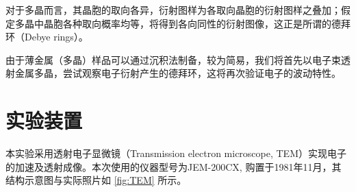 \documentclass[aps,pre,12pt,preprint,%
	onecolumn,showpacs,showkeys,nofootinbib]{revtex4-2}
\begin{document}
	对于多晶而言，其晶胞的取向各异，衍射图样为各取向晶胞的衍射图样之叠加；假定多晶中晶胞各种取向概率均等，将得到各向同性的衍射图像，这正是所谓的德拜环（Debye rings）。
	
	由于薄金属（多晶）样品可以通过沉积法制备，较为简易，我们将首先以电子束透射金属多晶，尝试观察电子衍射产生的德拜环，这将再次验证电子的波动特性。
\section{实验装置}
	本实验采用透射电子显微镜（Transmission electron microscope, TEM）实现电子的加速及透射成像。本次使用的仪器型号为JEM-200CX, 购置于1981年11月，其结构示意图与实际照片如 \autoref{fig:TEM} 所示。
	
\end{document}
